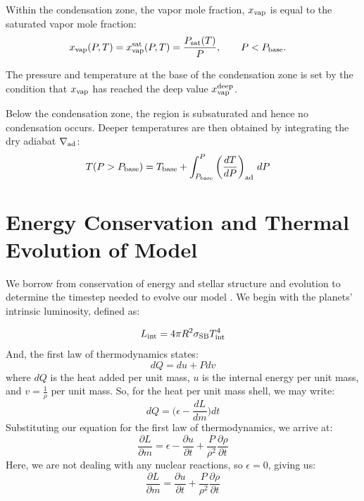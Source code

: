 \documentclass[11pt]{ucscthesisbs}
\begin{document}
Within the condensation zone, the vapor mole fraction, $x_{\rm vap}$ is equal to the saturated vapor mole fraction:
\begin{align}
x_{\rm vap}(P, T) &= x_{\rm vap}^{\rm sat}(P, T) = \frac{P_{\rm sat}(T)}{P}, \qquad P<P_{\rm base}.
\end{align}

The pressure and temperature at the base of the condensation zone is set by the condition that $x_{\rm vap}$ has reached the deep value $x_{\rm vap}^{\rm deep}$.

Below the condensation zone, the region is subsaturated and hence no condensation occurs. Deeper temperatures are then obtained by integrating the dry adiabat $\nabla_{\rm ad}$:
\begin{align}
T(P>P_{\rm base}) &= T_{\rm base} + \int_{P_{\rm base}}^P\left(\frac{dT}{dP}\right)_{\rm ad}\,d P
\end{align}



\section{Energy Conservation and Thermal Evolution of Model}
We borrow from conservation of energy and stellar structure and evolution to determine the timestep needed to evolve our model \citep{kippenhahn_2012}. We begin with the planets' intrinsic luminosity, defined as:

\begin{equation}
L_{\rm int} = 4\pi R^2\sigma_{\rm SB}T_{\rm int}^4
\end{equation}
And, the first law of thermodynamics states:
\begin{equation}
dQ = du + Pdv
\end{equation}
where $dQ$ is the heat added per unit mass, $u$ is the internal energy per unit mass, and $v = \frac{1}{\rho}$ per unit mass.
So, for the heat per unit mass shell, we may write:
\begin{equation}
dQ = \big(\epsilon - \frac{dL}{dm})dt
\end{equation}
Substituting our equation for the first law of thermodynamics, we arrive at:
\begin{equation}
\frac{\partial L}{\partial m} = \epsilon - \frac{\partial u}{\partial t} + \frac{P}{\rho^2}\frac{\partial \rho}{\partial t}
\end{equation}
Here, we are not dealing with any nuclear reactions, so $\epsilon = 0$, giving us:
\begin{equation}
\frac{\partial L}{\partial m} = \frac{\partial u}{\partial t} + \frac{P}{\rho^2}\frac{\partial \rho}{\partial t}
\end{equation}
\end{document}
